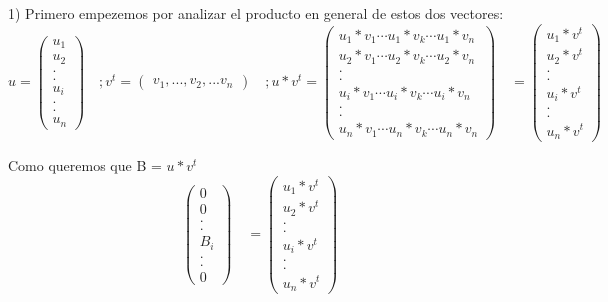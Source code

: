 \begin{itemize}
1) Primero empezemos por analizar el producto en general de estos dos vectores: 
$$
u=
\begin{pmatrix} 
u_1\\
u_2\\
.\\
.\\
u_i\\
.\\
.\\
u_n
\end{pmatrix}
\quad
 ;v^t=
\begin{pmatrix} 
v_1,...,v_2,...v_n
\end{pmatrix}
\quad
;u*v^t=
\begin{pmatrix} 
u_1*v_1 \cdots u_1*v_k \cdots u_1*v_n\\
u_2*v_1 \cdots u_2*v_k  \cdots u_2*v_n\\
.\\
.\\
u_i*v_1 \cdots u_i*v_k \cdots u_i*v_n\\
.\\
.\\
u_n*v_1 \cdots u_n*v_k  \cdots u_n*v_n
\end{pmatrix}
\quad
=
\begin{pmatrix} 
u_1*v^t\\
u_2*v^t\\
.\\
.\\
u_i*v^t\\
.\\
.\\
u_n*v^t
\end{pmatrix}
$$

Como queremos que B = $u*v^t$
$$
\begin{pmatrix} 
0\\
0\\
.\\
.\\
B_i\\
.\\
.\\
0
\end{pmatrix}
\quad
=
\begin{pmatrix} 
u_1*v^t\\
u_2*v^t\\
.\\
.\\
u_i*v^t\\
.\\
.\\
u_n*v^t
\end{pmatrix}
$$


\end{itemize}
